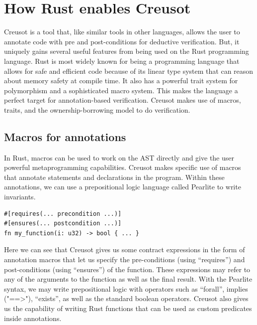 \documentclass[12pt]{article}
\begin{document}
\section{How Rust enables Creusot}


Creusot is a tool that, like similar tools in other languages, allows the user to annotate code with pre and post-conditions for deductive verification.
But, it uniquely gains several useful features from being used on the Rust programming language. 
Rust is most widely known for being a programming language that allows for safe and efficient code because of its linear type system that can reason about memory safety at compile time. 
It also has a powerful trait system for polymorphism and a sophisticated macro system. 
This makes the language a perfect target for annotation-based verification. 
Creusot makes use of macros, traits, and the ownership-borrowing model to do verification. 

\subsection{Macros for annotations}
In Rust, macros can be used to work on the AST directly and give the user powerful metaprogramming capabilities. 
Creusot makes specific use of macros that annotate statements and declarations in the program. 
Within these annotations, we can use a prepositional logic language called Pearlite to write invariants. 
\begin{verbatim}
#[requires(... precondition ...)]
#[ensures(... postcondition ...)]
fn my_function(i: u32) -> bool { ... }
\end{verbatim}

Here we can see that Creusot gives us some contract expressions in the form of annotation macros that let us specify the pre-conditions (using ``requires'') and post-conditions (using ``ensures'') of the function. 
These expressions may refer to any of the arguments to the function as well as the final result. 
With the Pearlite syntax, we may write prepositional logic with operators such as ``forall'', implies ("==>"), ``exists'', as well as the standard boolean operators. 
Creusot also gives us the capability of writing Rust functions that can be used as custom predicates inside annotations. 
\end{document}
